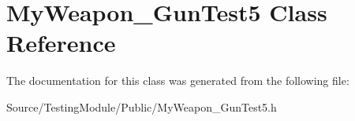 \hypertarget{class_my_weapon___gun_test5}{}\section{My\+Weapon\+\_\+\+Gun\+Test5 Class Reference}
\label{class_my_weapon___gun_test5}


The documentation for this class was generated from the following file\+:\begin{DoxyCompactItemize}
\item 
Source/\+Testing\+Module/\+Public/My\+Weapon\+\_\+\+Gun\+Test5.\+h\end{DoxyCompactItemize}
